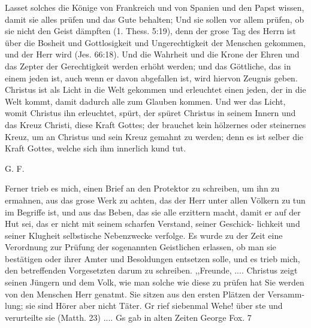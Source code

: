 {Lasset solches die Könige von Frankreich und von Spanien
und den Papst wissen, damit sie alles prüfen und das Gute behalten;
Und sie sollen vor allem prüfen, ob sie nicht den Geist dämpften
(1. Thess. 5:19), 
denn der grose Tag des Herrn ist über die
Bosheit und Gottlosigkeit und Ungerechtigkeit der Menschen
gekommen, und der Herr wird  (Jes. 66:18). 
Und die Wahrheit
und die Krone der Ehren und das Zepter der Gerechtigkeit
werden erhöht werden; und das Göttliche, das in einem jeden
ist, auch wenn er davon abgefallen ist, wird hiervon Zeugnis
geben. Christus ist als Licht in die Welt gekommen und erleuchtet
einen jeden, der in die Welt kommt, damit dadurch alle zum
Glauben kommen. Und wer das Licht, womit Christus ihn
erleuchtet, spürt, der spüret Christus in seinem Innern und das
Kreuz Christi, diese Kraft Gottes; der brauchet kein hölzernes oder
steinernes Kreuz, 
um an Christus und sein Kreuz gemahnt zu
werden; denn es ist selber die Kraft Gottes, welche sich ihm
innerlich kund tut.
\begin{flushright}G. F.\end{flushright}
\bigskip
}

Ferner trieb es mich, einen Brief an den Protektor zu
schreiben, um ihn zu ermahnen, aus das grose Werk zu achten,
das der Herr unter allen Völkern zu tun im Begriffe ist, und
aus das Beben, das sie alle erzittern macht, damit er auf der
Hut sei, das er nicht mit seinem scharfen Verstand, seiner Geschick-
lichkeit und seiner Klugheit selbstische Nebenzwecke verfolge.
Es wurde zu der Zeit eine Verordnung zur Prüfung der
sogenannten Geistlichen erlassen, ob man sie bestätigen oder ihrer
Amter und Besoldungen entsetzen solle, und es trieb mich, den
betreffenden Vorgesetzten darum zu schreiben.
,,Freunde,
.... Christus zeigt seinen Jüngern und dem Volk, wie
man solche wie diese zu prüfen hat Sie werden von den Menschen
Herr genatmt. Sie sitzen aus den ersten Plätzen der Versamm-
lung; sie sind Hörer aber nicht Täter. Gr rief siebenmal Wehe!
über ste und verurteilte sie (Matth. 23) .... Gs gab in alten Zeiten
George Fox. 7


